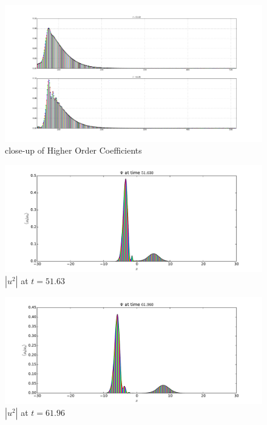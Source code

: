 \begin{figure}
\includegraphics[width=\textwidth]{Figures/tunneling_coeffs_close.pdf}
\caption{close-up of Higher Order Coefficients}
\label{fig:tunneling_coeffs_close}
\end{figure}

\begin{figure}
\includegraphics[width=\textwidth]{Figures/wavepacket_timestep_51_630.pdf}
\caption{$|u^2|$ at $t=51.63$}
\label{fig:wavepacket_at_51_63}
\end{figure}

\begin{figure}
\includegraphics[width=\textwidth]{Figures/wavepacket_timestep_61_960.pdf}
\caption{$|u^2|$ at $t=61.96$}
\label{fig:wavepacket_at_61_96}
\end{figure}
\FloatBarrier
